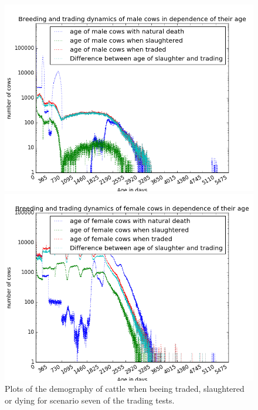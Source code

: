 \begin{figure}[htbp] 
\begin{minipage}{0.5\textwidth}
\centering
\noindent\includegraphics[width=0.9\linewidth,height=\textheight,
keepaspectratio]{scen7maleDemography.png} 
\end{minipage}
\begin{minipage}{0.5\textwidth}
\centering
\noindent\includegraphics[width=0.9\linewidth,height=\textheight,
keepaspectratio]{scen7femaleDemography.png} 
\end{minipage}
\caption[Demography in Scenario 7]{Plots of the demography of cattle when beeing traded, slaughtered or dying for scenario seven of the trading tests.}
\label{fig:demographyScen7}
\end{figure} 
